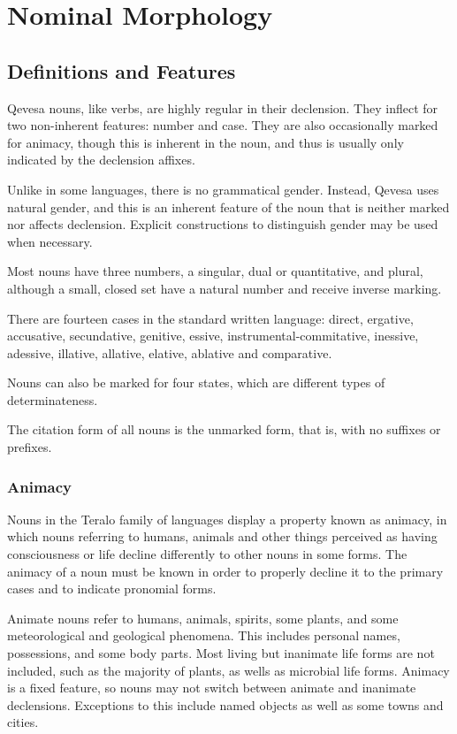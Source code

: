 \documentclass[grammar]{subfiles}
\begin{document}
\chapter{Nominal Morphology}
\label{ch:nominal_morphology}

\section{Definitions and Features}
\label{sec:nm_definition_features}

Qevesa nouns, like verbs, are highly regular in their declension.  They
inflect for two non-inherent features: number and case.  They are also
occasionally marked for animacy, though this is inherent in the noun, and
thus is usually only indicated by the declension affixes. 

Unlike in some languages, there is no grammatical gender.  Instead, Qevesa
uses natural gender, and this is an inherent feature of the noun that is
neither marked nor affects declension.  Explicit constructions to distinguish
gender may be used when necessary.

Most nouns have three numbers, a singular, dual or quantitative, and plural,
although a small, closed set have a natural number and receive inverse
marking. 

There are fourteen cases in the standard written language: direct, ergative,
accusative, secundative, genitive, essive, instrumental-commitative,
inessive, adessive, illative, allative, elative, ablative and comparative.

Nouns can also be marked for four states, which are different types of determinateness.

The citation form of all nouns is the unmarked form, that is, with no suffixes or prefixes.

\subsection{Animacy}
\label{ssec:nm_animacy}

Nouns in the Teralo family of languages display a property known as animacy,
in which nouns referring to humans, animals and other things perceived as
having consciousness or life decline differently to other nouns in some
forms.  The animacy of a noun must be known in order to properly decline it
to the primary cases and to indicate pronomial forms.

Animate nouns refer to humans, animals, spirits, some plants, and some
meteorological and geological phenomena.  This includes personal names,
possessions, and some body parts.  Most living but inanimate life forms are
not included, such as the majority of plants, as wells as microbial life
forms.  Animacy is a fixed feature, so nouns may not switch between animate
and inanimate declensions.  Exceptions to this include named objects as well
as some towns and cities.
\end{document}
